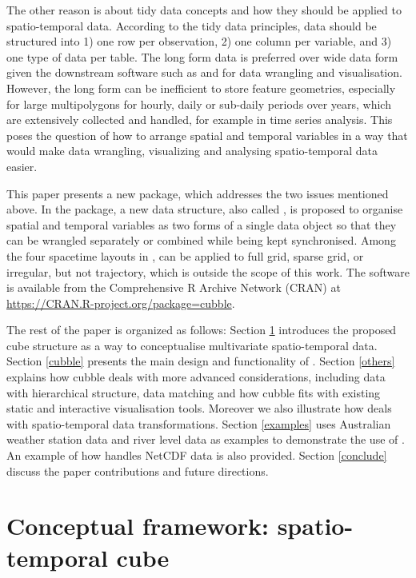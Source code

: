 \documentclass[
]{jss}
\begin{document}
The other reason is about tidy data concepts \citep{tidydata} and how they should be applied to spatio-temporal data. According to the tidy data principles, data should be structured into 1) one row per observation, 2) one column per variable, and 3) one type of data per table. The long form data is preferred over wide data form given the downstream software such as  \citep{dplyr} and  \citep{ggplot2} for data wrangling and visualisation. However, the long form can be inefficient to store feature geometries, especially for large multipolygons for hourly, daily or sub-daily periods over years, which are extensively collected and handled, for example in time series analysis. This poses the question of how to arrange spatial and temporal variables in a way that would make data wrangling, visualizing and analysing spatio-temporal data easier.

This paper presents a new  package,  which addresses the two issues mentioned above. In the package, a new data structure, also called , is proposed to organise spatial and temporal variables as two forms of a single data object so that they can be wrangled separately or combined while being kept synchronised. Among the four spacetime layouts in \citet{spacetime},  can be applied to full grid, sparse grid, or irregular, but not trajectory, which is outside the scope of this work. The software is available from the Comprehensive R Archive Network (CRAN) at \url{https://CRAN.R-project.org/package=cubble}.

The rest of the paper is organized as follows: Section \ref{cube} introduces the proposed cube structure as a way to conceptualise multivariate spatio-temporal data. Section \ref{cubble} presents the main design and functionality of . Section \ref{others} explains how cubble deals with more advanced considerations, including data with hierarchical structure, data matching and how cubble fits with existing static and interactive visualisation tools. Moreover we also illustrate how  deals with spatio-temporal data transformations. Section \ref{examples} uses Australian weather station data and river level data as examples to demonstrate the use of . An example of how  handles NetCDF data is also provided. Section \ref{conclude} discuss the paper contributions and future directions.

\hypertarget{cube}{%
\section{Conceptual framework: spatio-temporal cube}\label{cube}}
\end{document}
